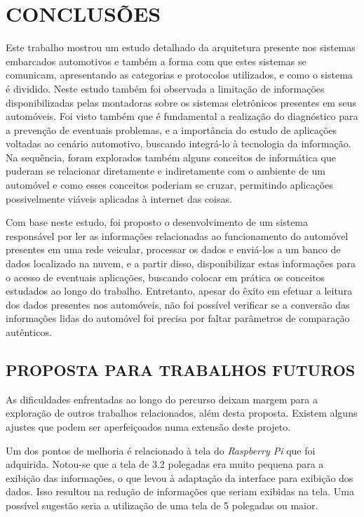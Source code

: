 \chapter{CONCLUSÕES}\label{CAP7}
Este trabalho mostrou um estudo detalhado da arquitetura presente nos sistemas embarcados automotivos e também a forma com que estes sistemas se comunicam, apresentando as categorias e protocolos utilizados, e como o sistema é dividido. Neste estudo também foi observada a limitação de informações disponibilizadas pelas montadoras sobre os sistemas eletrônicos presentes em seus automóveis. Foi visto também que é fundamental a realização do diagnóstico para a prevenção de eventuais problemas, e a importância do estudo de aplicações voltadas ao cenário automotivo, buscando integrá-lo à tecnologia da informação. Na sequência, foram explorados também alguns conceitos de informática que puderam se relacionar diretamente e indiretamente com o ambiente de um automóvel e como esses conceitos poderiam se cruzar, permitindo aplicações possivelmente viáveis aplicadas à internet das coisas.

Com base neste estudo, foi proposto o desenvolvimento de um sistema responsável por ler as informações relacionadas ao funcionamento do automóvel presentes em uma rede veicular, processar os dados e enviá-los a um banco de dados localizado na nuvem, e a partir disso, disponibilizar estas informações para o acesso de eventuais aplicações, buscando colocar em prática os conceitos estudados ao longo do trabalho. Entretanto, apesar do êxito em efetuar a leitura dos dados presentes nos automóveis, não foi possível verificar se a conversão das informações lidas do automóvel foi precisa por faltar parâmetros de comparação autênticos.

\section{PROPOSTA PARA TRABALHOS FUTUROS}
As dificuldades enfrentadas ao longo do percurso deixam margem para a exploração de outros trabalhos relacionados, além desta proposta. Existem alguns ajustes que podem ser aperfeiçoados numa extensão deste projeto.

Um dos pontos de melhoria é relacionado à tela do \textit{Raspberry Pi} que foi adquirida. Notou-se que a tela de 3.2 polegadas era muito pequena para a exibição das informações, o que levou à adaptação da interface para exibição dos dados. Isso resultou na redução de informações que seriam exibidas na tela. Uma possível sugestão seria a utilização de uma tela de 5 polegadas ou maior.

